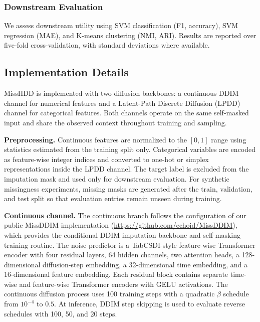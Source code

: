 \documentclass[times, review, 10pt]{elsarticle}
\begin{document}
\subsubsection{Downstream Evaluation}

We assess downstream utility using SVM classification (F1, accuracy), SVM
regression (MAE), and K-means clustering (NMI, ARI). Results are reported over
five-fold cross-validation, with standard deviations where available.
\subsection{Implementation Details}

MissHDD is implemented with two diffusion backbones: a continuous DDIM
channel for numerical features and a Latent-Path Discrete Diffusion (LPDD)
channel for categorical features. Both channels operate on the same
self-masked input and share the observed context throughout training and
sampling.

\textbf{Preprocessing.}
Continuous features are normalized to the $[0,1]$ range using statistics
estimated from the training split only. Categorical variables are encoded as
feature-wise integer indices and converted to one-hot or simplex
representations inside the LPDD channel. The target label is excluded from
the imputation mask and used only for downstream evaluation. For synthetic
missingness experiments, missing masks are generated after the train,
validation, and test split so that evaluation entries remain unseen during
training.

\textbf{Continuous channel.}
The continuous branch follows the configuration of our public MissDDIM
implementation (\url{https://github.com/echoid/MissDDIM}), which provides the
conditional DDIM imputation backbone and self-masking training routine. The
noise predictor is a TabCSDI-style feature-wise Transformer encoder with four
residual layers, 64 hidden channels, two attention heads, a 128-dimensional
diffusion-step embedding, a 32-dimensional time embedding, and a
16-dimensional feature embedding. Each residual block contains separate
time-wise and feature-wise Transformer encoders with GELU activations. The
continuous diffusion process uses 100 training steps with a quadratic
$\beta$ schedule from $10^{-4}$ to $0.5$. At inference, DDIM step skipping is
used to evaluate reverse schedules with 100, 50, and 20 steps.
\end{document}
